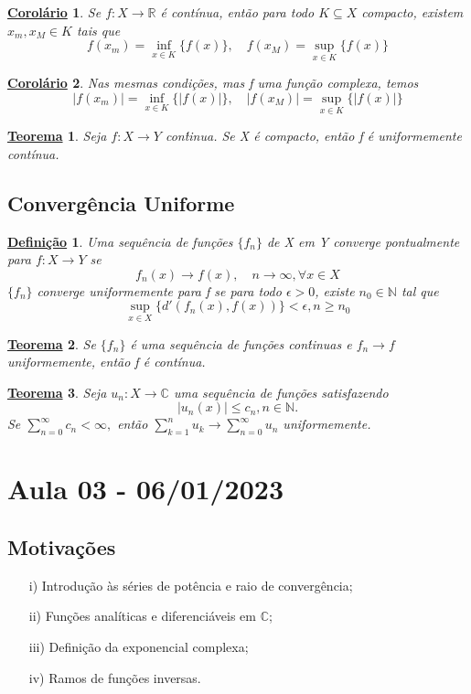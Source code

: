 \documentclass{article}
\newtheorem*{def*}{\underline{Defini\c c\~ao}}
\newtheorem*{theorem*}{\underline{Teorema}}
\newtheorem*{crl*}{\underline{Corol\'ario}}
\begin{document}
\begin{crl*}
  Se $f:X\rightarrow \mathbb{R}$ \'e cont\'inua, ent\~ao para todo $K \subseteq{X}$ compacto, existem $x _{m}, x _{M}\in{K}$
tais que 
  $$
  f(x _{m}) = \inf _{x\in{K}} \{f(x)\}, \quad f(x _{M}) = \sup _{x\in{K}} \{f(x)\}
  $$
\end{crl*}
\begin{crl*}
  Nas mesmas condi\c c\~oes, mas f uma fun\c c\~ao complexa, temos 
  $$
  |f(x _{m})| = \inf _{x\in{K}} \{|f(x)|\}, \quad |f(x _{M})| = \sup _{x\in{K}} \{|f(x)|\}
  $$
\end{crl*}
\begin{theorem*}
  Seja $f:X\rightarrow Y$ con\'tinua. Se X \'e compacto, ent\~ao f \'e uniformemente cont\'inua.
\end{theorem*}

\subsection{Converg\^encia Uniforme}
\begin{def*}
  Uma sequ\^encia de fun\c c\~oes $\{f_{n}\}$ de X em Y converge pontualmente para $f:X\rightarrow Y$ se 
  $$
  f_{n}(x)\to f(x), \quad n\to\infty, \forall{x\in{X}}
  $$
  $\{f_{n}\}$ converge uniformemente para f se para todo $\epsilon > 0$, existe $n_{0}\in \mathbb{N}$ tal que
  $$
  \sup _{x\in{X}} \{d'(f_{n}(x), f(x))\} < \epsilon, n\geq{n_{0}}
  $$  
\end{def*}
\begin{theorem*}
  Se $\{f_{n}\}$ \'e uma sequ\^encia de fun\c c\~oes con\'tinuas e $f_{n}\to{f}$ uniformemente, ent\~ao f \'e cont\'inua.
\end{theorem*}
\begin{theorem*}
  Seja $u_{n}:X\rightarrow \mathbb{C}$ uma sequ\^encia de fun\c c\~oes satisfazendo
  $$
  |u_{n}(x)|\leq c_{n}, n\in \mathbb{N}.
  $$
  Se $\sum\limits_{n=0}^{\infty}c_{n} < \infty,$ ent\~ao $\sum\limits_{k=1}^{n}u_{k}\to \sum\limits_{n=0}^{\infty}u_{n}$ uniformemente.
\end{theorem*}
\newpage

\section{Aula 03 - 06/01/2023}
\subsection{Motiva\c c\~oes}
\begin{itemize}
  \item[i)] Introdu\c c\~ao \`as s\'eries de pot\^encia e raio de converg\^encia;
  \item[ii)] Fun\c c\~oes anal\'iticas e diferenci\'aveis em $\mathbb{C}$;
  \item[iii)] Defini\c c\~ao da exponencial complexa;
  \item[iv)] Ramos de fun\c c\~oes inversas.
\end{itemize}
\end{document}
